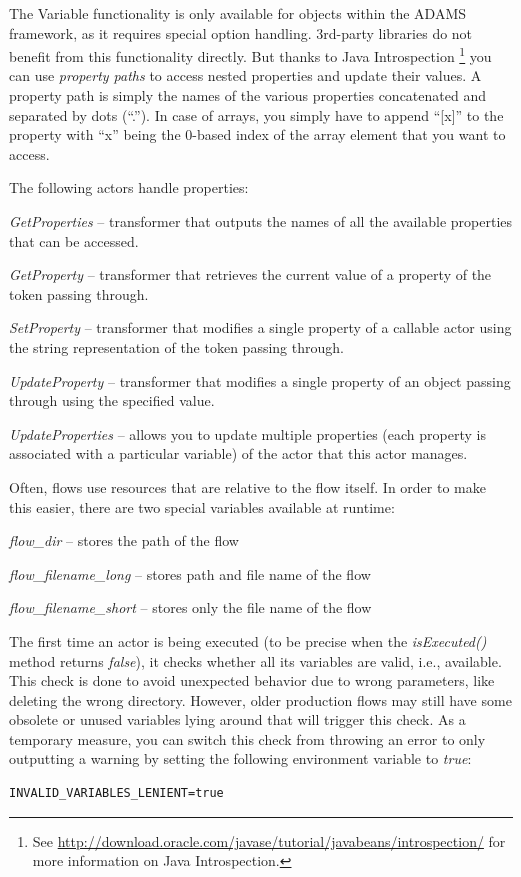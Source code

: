 The Variable functionality is only available for objects within the ADAMS
framework, as it requires special option handling. 3rd-party libraries do not
benefit from this functionality directly. But thanks to Java Introspection
\footnote{See
\url{http://download.oracle.com/javase/tutorial/javabeans/introspection/}{} for
more information on Java Introspection.} you can use \textit{property paths} to
access nested properties and update their values. A property path is simply the
names of the various properties concatenated and separated by dots (``.''). In
case of arrays, you simply have to append ``[x]'' to the property with ``x''
being the 0-based index of the array element that you want to access.

The following actors handle properties:
\begin{tight_itemize}
	\item \textit{GetProperties} -- transformer that outputs the names
	of all the available properties that can be accessed.
	\item \textit{GetProperty} -- transformer that retrieves the current
	value of a property of the token passing through.
	\item \textit{SetProperty} -- transformer that modifies a single property of a
	callable actor using the string representation of the token passing through.
	\item \textit{UpdateProperty} -- transformer that modifies a single property
	of an object passing through using the specified value.
	\item \textit{UpdateProperties} -- allows you to update multiple properties
	(each property is associated with a particular variable) of the actor that
	this actor manages.
\end{tight_itemize}

Often, flows use resources that are relative to the flow itself. In order to
make this easier, there are two special variables available at runtime:
\begin{tight_itemize}
	\item \textit{flow\_dir} -- stores the path of the flow
	\item \textit{flow\_filename\_long} -- stores path and file name of the flow
	\item \textit{flow\_filename\_short} -- stores only the file name of the flow
\end{tight_itemize}

The first time an actor is being executed (to be precise when the \textit{isExecuted()}
method returns \textit{false}), it checks whether all its variables are valid, i.e.,
available. This check is done to avoid unexpected behavior due to wrong parameters,
like deleting the wrong directory. However, older production flows may still
have some obsolete or unused variables lying around that will trigger this check.
As a temporary measure, you can switch this check from throwing an error to
only outputting a warning by setting the following environment variable to
\textit{true}:
\begin{verbatim}
INVALID_VARIABLES_LENIENT=true
\end{verbatim}

